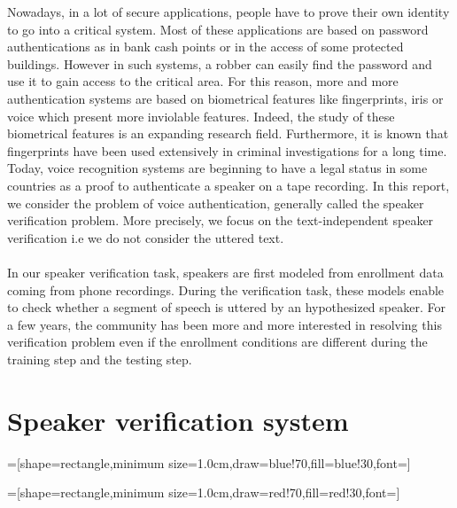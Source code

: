\documentclass{techrep} %
\begin{document}
Nowadays, in a lot of secure applications, people have to prove their
own identity to go into a critical system. Most of these applications
are based on password authentications as in bank cash points or in the
access of some protected buildings. However in such systems, a robber
can easily find the password and use it to gain access to the critical
area. For this reason, more and more authentication systems are based
on biometrical features like fingerprints, iris or voice which present
more inviolable features. Indeed, the study of these biometrical
features is an expanding research field. Furthermore, it is known that
fingerprints have been used extensively in criminal investigations for
a long time. Today, voice recognition systems are beginning to have a
legal status in some countries as a proof to authenticate a speaker on
a tape recording.  In this report, we consider the problem of voice
authentication, generally called the speaker verification
problem. More precisely, we focus on the text-independent speaker
verification i.e we do not consider the uttered text.\\\\ In our
speaker verification task, speakers are first modeled from enrollment
data coming from phone recordings. During the verification task, these
models enable to check whether a segment of speech is uttered by an
hypothesized speaker. For a few years, the community has been more and
more interested in resolving this verification problem even if the
enrollment conditions are different during the training step and the
testing step.

\section{Speaker verification system}

=[shape=rectangle,minimum
  size=1.0cm,draw=blue!70,fill=blue!30,font=\small]

=[shape=rectangle,minimum
  size=1.0cm,draw=red!70,fill=red!30,font=\small]

\begin{center}
\end{center}
\end{document}
